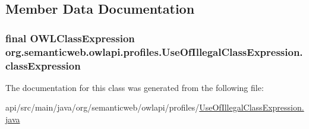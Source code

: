 \subsection{Member Data Documentation}
\hypertarget{classorg_1_1semanticweb_1_1owlapi_1_1profiles_1_1_use_of_illegal_class_expression_aa4561e3c7abbb0f438f5e3adad5977f0}{
\subsubsection[{class\-Expression}]{\setlength{\rightskip}{0pt plus 5cm}final {\bf O\-W\-L\-Class\-Expression} org.\-semanticweb.\-owlapi.\-profiles.\-Use\-Of\-Illegal\-Class\-Expression.\-class\-Expression\hspace{0.3cm}{\ttfamily [private]}}}\label{classorg_1_1semanticweb_1_1owlapi_1_1profiles_1_1_use_of_illegal_class_expression_aa4561e3c7abbb0f438f5e3adad5977f0}


The documentation for this class was generated from the following file\-:\begin{DoxyCompactItemize}
\item 
api/src/main/java/org/semanticweb/owlapi/profiles/\hyperlink{_use_of_illegal_class_expression_8java}{Use\-Of\-Illegal\-Class\-Expression.\-java}\end{DoxyCompactItemize}
